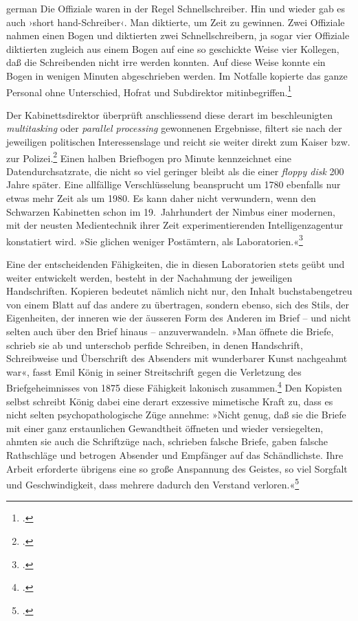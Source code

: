 \documentclass[a4paper,11pt]{article}
\newcommand{\anf}[1]{»#1«}
\newcommand{\inanf}[1]{›#1‹}
\newenvironment{zitat}{
\begin{foreigndisplayquote}{german}}%
{\end{foreigndisplayquote}}
\begin{document}
\begin{zitat}
Die Offiziale waren in der Regel Schnellschreiber. Hin und wieder gab es auch \inanf{short hand-Schreiber}. Man diktierte, um Zeit zu gewinnen. Zwei Offiziale nahmen einen Bogen und diktierten zwei Schnellschreibern, ja sogar vier Offiziale diktierten zugleich aus einem Bogen auf eine so geschickte Weise vier Kollegen, daß die Schreibenden nicht irre werden konnten. Auf diese Weise konnte ein Bogen in wenigen Minuten abgeschrieben werden. Im Notfalle kopierte das ganze Personal ohne Unterschied, Hofrat und Subdirektor mitinbegriffen.\footcite[139]{stix:1937}
\end{zitat}
Der Kabinettsdirektor überprüft anschliessend diese derart im beschleunigten \emph{multitasking} oder \emph{parallel processing} gewonnenen Ergebnisse, filtert sie nach der jeweiligen politischen Interessenslage und reicht sie weiter direkt zum Kaiser bzw. zur Polizei.\footcite[140]{stix:1937} Einen halben Briefbogen pro Minute kennzeichnet eine Datendurchsatzrate, die nicht so viel geringer bleibt als die einer \emph{floppy disk} 200 Jahre später. Eine allfällige Verschlüsselung beansprucht um 1780 ebenfalls nur etwas mehr Zeit als um 1980. Es kann daher nicht verwundern, wenn den Schwarzen Kabinetten schon im 19.~Jahrhundert der Nimbus einer modernen, mit der neusten Medientechnik ihrer Zeit experimentierenden Intelligenzagentur konstatiert wird. \anf{Sie glichen weniger Postämtern, als Laboratorien.}\footcite[40]{koenig:1875}

Eine der entscheidenden Fähigkeiten, die in diesen Laboratorien stets geübt und weiter entwickelt werden, besteht in der Nachahmung der jeweiligen Handschriften. Kopieren bedeutet nämlich nicht nur, den Inhalt buchstabengetreu von einem Blatt auf das andere zu übertragen, sondern ebenso, sich des Stils, der Eigenheiten, der inneren wie der äusseren Form des Anderen im Brief – und nicht selten auch über den Brief hinaus – anzuverwandeln. \anf{Man öffnete die Briefe, schrieb sie ab und unterschob perfide Schreiben, in denen Handschrift, Schreibweise und Überschrift des Absenders mit wunderbarer Kunst nachgeahmt war}, fasst Emil König in seiner Streitschrift gegen die Verletzung des Briefgeheimnisses von 1875 diese Fähigkeit lakonisch zusammen.\footcite[34]{koenig:1875} Den Kopisten selbst schreibt König dabei eine derart exzessive mimetische Kraft zu, dass es nicht selten psychopathologische Züge annehme: \anf{Nicht genug, daß sie die Briefe mit einer ganz erstaunlichen Gewandtheit öffneten und wieder versiegelten, ahmten sie auch die Schriftzüge nach, schrieben falsche Briefe, gaben falsche Rathschläge und betrogen Absender und Empfänger auf das Schändlichste. Ihre Arbeit erforderte übrigens eine so große Anspannung des Geistes, so viel Sorgfalt und Geschwindigkeit, dass mehrere dadurch den Verstand verloren.}\footcite[38]{koenig:1875} 
\end{document}
